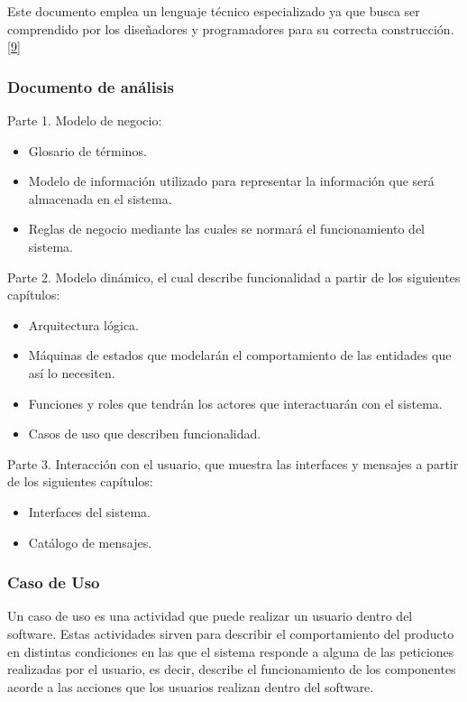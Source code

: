 Este documento emplea un lenguaje técnico especializado ya que busca ser comprendido por los diseñadores y programadores para su correcta construcción. \hyperlink{b09}{[9]} 

\subsubsection{Documento de análisis}

Parte 1. Modelo de negocio:
\begin{itemize}
	\item Glosario de términos.
	\item Modelo de información utilizado para representar la información que será almacenada en el sistema.
	\item Reglas de negocio mediante las cuales se normará el funcionamiento del sistema.
\end{itemize}

Parte 2. Modelo dinámico, el cual describe funcionalidad a partir de los siguientes capítulos:
\begin{itemize}
	\item Arquitectura lógica.
	\item Máquinas de estados que modelarán el comportamiento de las entidades que así lo necesiten.
	\item Funciones y roles que tendrán los actores que interactuarán con el sistema.
	\item Casos de uso que describen funcionalidad.
\end{itemize}

Parte 3. Interacción con el usuario, que muestra las interfaces y mensajes a partir de los siguientes capítulos:
\begin{itemize}
	\item Interfaces del sistema.
	\item Catálogo de mensajes.
\end{itemize}



\subsubsection{Caso de Uso}

Un caso de uso es una actividad que puede realizar un usuario dentro del software. Estas actividades sirven para describir el comportamiento del producto en distintas condiciones en las que el sistema responde a alguna de las peticiones realizadas por el usuario, es decir, describe el funcionamiento de los componentes acorde a las acciones que los usuarios realizan dentro del software.

